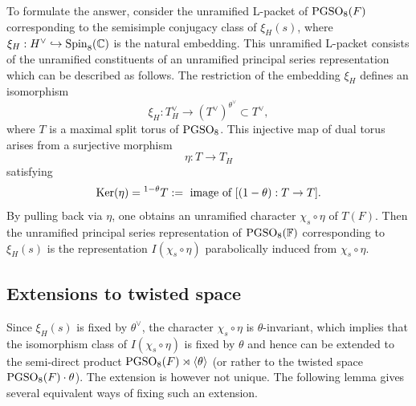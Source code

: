 \documentclass[11pt]{amsart}
\theoremstyle{plain}
\numberwithin{equation}{section}
\newcommand{\C}{\mathbb C}
\newcommand{\F}{\mathbb F}
\def\PGSO{{\rm PGSO}}
\def\Spin{{\rm Spin}}
\def\Spin{{\rm Spin}}
\def\C{{\bf C}}
\def\C{{\mathbb C}}
\begin{document}
\vskip 5pt

  To formulate the answer, consider the unramified L-packet  of $\PGSO_8(F)$ corresponding to the semisimple conjugacy class of $\xi_H(s)$, where $\xi_H: H^{\vee} \hookrightarrow \Spin_8(\C)$ is the natural embedding. This unramified L-packet consists of the unramified constituents of an unramified principal series representation which can be described as follows. 
 The restriction of the embedding $\xi_H$ defines an isomorphism
  \[  \xi_H:  T_H^{\vee}  \longrightarrow (T^{\vee})^{\theta^{\vee}}  \subset T^{\vee}, \]
  where $T$ is a maximal split torus of $\PGSO_8$.  This injective  map of dual torus arises from a surjective morphism 
  \begin{equation} 
  \label{E:eta1}
      \eta: T \longrightarrow T_H\end{equation}
  satisfying
  \begin{equation} \label{E:eta2}
   {\rm Ker}(\eta) = {}^{1 - \theta}T := \text{ image of $[(1- \theta):T \rightarrow T]$.} \end{equation}
  By pulling back via $\eta$,  one obtains an unramified character  $\chi_s \circ \eta$  of $T(F)$.  Then the unramified principal series representation of $\PGSO_8(\F)$ corresponding to $\xi_H(s)$ is the representation
     $I(\chi_s \circ \eta)$ parabolically induced from $\chi_s \circ \eta$. 
  \vskip 5pt
  
\subsection{\bf Extensions to twisted space}   Since $\xi_H(s)$ is fixed by $\theta^{\vee}$, the character $\chi_s \circ \eta$ is $\theta$-invariant, which implies that 
     the isomorphism class of $I(\chi_s \circ \eta)$  is fixed by $\theta$ and hence  can be extended to the semi-direct product $\PGSO_8(F) \rtimes \langle \theta \rangle$ (or rather to the twisted space $\PGSO_8(F) \cdot \theta$).
     The extension is however not unique.     The following lemma gives several equivalent ways of fixing such an extension.
     
     \vskip 5pt
     
\end{document}
